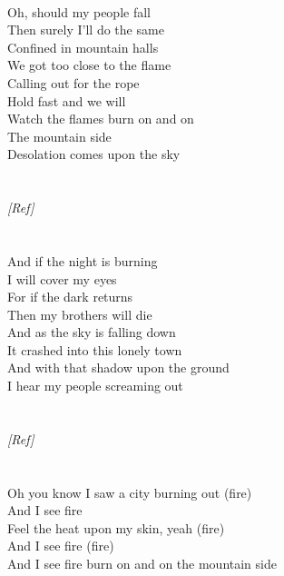 {{\\
Oh, should my people fall\\
Then surely I'll do the same\\
Confined in mountain halls\\
We got too close to the flame\\
Calling out for the rope\\
Hold fast and we will\\
Watch the flames burn on and on\\
The mountain side\\
Desolation comes upon the sky}\\
\\\noindent\vbox{~\\
\emph{[Ref]}}\\
\\\noindent\vbox{~\\
And if the night is burning\\
I will cover my eyes\\
For if the dark returns\\
Then my brothers will die\\
And as the sky is falling down\\
It crashed into this lonely town\\
And with that shadow upon the ground\\
I hear my people screaming out}\\
\\\noindent\vbox{~\\
\emph{[Ref]}}\\
\\\noindent\vbox{~\\
Oh you know I saw a city burning out (fire)\\
And I see fire\\
Feel the heat upon my skin, yeah (fire)\\
And I see fire (fire)\\
And I see fire burn on and on the mountain side}
}


